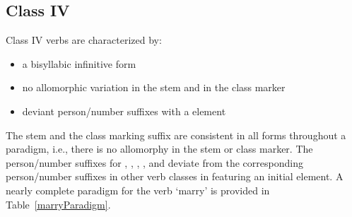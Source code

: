\clearpage


\subsection{Class IV}\label{VclassIV}
Class IV verbs are characterized by: 
\begin{itemize}
\item{a bisyllabic infinitive form}
\item{no allomorphic variation in the stem and in the class marker}
\item{deviant person/number suffixes with a  element}
\end{itemize}
The stem and the class marking suffix are consistent in all forms throughout a paradigm, i.e., there is no allomorphy in the stem or class marker. 
The person/number suffixes for , , , ,  and  deviate from the corresponding person/number suffixes in other verb classes in featuring an initial  element. 
A nearly complete paradigm for the verb  ‘marry’ is provided in Table~\vref{marryParadigm}.
